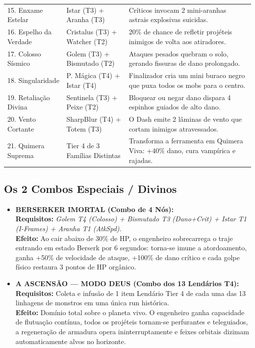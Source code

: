 \documentclass[a4paper,12pt]{report}
\begin{document}
{\begin{tabular}{|l|p{4.5cm}|p{8cm}|}
    15. Enxame Estelar        & Istar (T3) + Aranha (T3)     & Críticos invocam 2 mini-aranhas astrais explosivas suicidas. \\
    16. Espelho da Verdade    & Cristalus (T3) + Watcher (T2)& 20\% de chance de refletir projéteis inimigos de volta aos atiradores. \\
    17. Colosso Sísmico       & Golem (T3) + Bismutado (T2)  & Ataques pesados quebram o solo, gerando fissuras de dano prolongado. \\
    18. Singularidade         & P. Mágica (T4) + Istar (T4)  & Finalizador cria um mini buraco negro que puxa todos os mobs para o centro. \\
    19. Retaliação Divina     & Sentinela (T3) + Peixe (T2)  & Bloquear ou negar dano dispara 4 espinhos guiados de alto dano. \\
    20. Vento Cortante        & SharpBlur (T4) + Totem (T3)  & O Dash emite 2 lâminas de vento que cortam inimigos atravessados. \\
    21. Quimera Suprema       & Tier 4 de 3 Famílias Distintas & Transforma a ferramenta em Quimera Viva: +40\% dano, cura vampírica e rajadas. \\
    \hline
\end{tabular}
}

\subsection{Os 2 Combos Especiais / Divinos}
\begin{itemize}
    \item \textbf{ BERSERKER IMORTAL (Combo de 4 Nós):} \\
    \textbf{Requisitos:} \textit{Golem T4 (Colosso) + Bismutado T3 (Dano+Crit) + Istar T1 (I-Frames) + Aranha T1 (AtkSpd)}. \\
    \textbf{Efeito:} Ao cair abaixo de 30\% de HP, o engenheiro sobrecarrega o traje entrando em estado Berserk por 6 segundos: torna-se imune a atordoamento, ganha +50\% de velocidade de ataque, +100\% de dano crítico e cada golpe físico restaura 3 pontos de HP orgânico.
    \item \textbf{ A ASCENSÃO --- MODO DEUS (Combo dos 13 Lendários T4):} \\
    \textbf{Requisitos:} Coleta e infusão de 1 item Lendário Tier 4 de cada uma das 13 linhagens de monstros em uma única run histórica. \\
    \textbf{Efeito:} Domínio total sobre o planeta vivo. O engenheiro ganha capacidade de flutuação contínua, todos os projéteis tornam-se perfurantes e teleguiados, a regeneração de armadura opera ininterruptamente e feixes orbitais dizimam automaticamente alvos no horizonte.
\end{itemize}
\end{document}
